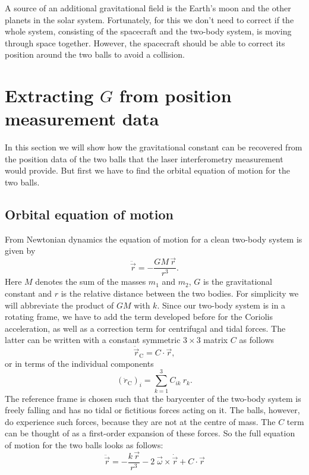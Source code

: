 \documentclass[onecolumn]{aa} %
\begin{document}
A source of an additional gravitational field is the Earth's moon and the other planets in the solar system. Fortunately, for this we don't need to correct if the whole system, consisting of the spacecraft and the two-body system, is moving through space together. However, the spacecraft should be able to correct its position around the two balls to avoid a collision.


\section{Extracting $G$ from position measurement data}

In this section we will show how the gravitational constant can be
recovered from the position data of the two balls that the laser
interferometry measurement would provide.  But first we have to find
the orbital equation of motion for the two balls.

\subsection{Orbital equation of motion}
From Newtonian dynamics the equation of motion for a clean two-body system is given by 
\begin{equation}
\label{eq:eomeasy}
\ddot{\vec{r}} = - \frac{G M\, \vec{r}}{r^3}.
\end{equation}
Here $M$ denotes the sum of the masses $m_1$ and $m_2$, $G$ is the
gravitational constant and $r$ is the relative distance between the
two bodies. For simplicity we will abbreviate the product of $GM$ with
$k$.  Since our two-body system is in a rotating frame, we have to add
the term developed before for the Coriolis acceleration, as well as a
correction term for centrifugal and tidal forces. The latter can be
written with a constant symmetric $3 \times 3$ matrix $C$ as follows
\begin{equation}
\label{eq:tidal}
\ddot{\vec{r}}_{\mathrm{C}} = C \cdot \vec{r},
\end{equation}
or in terms of the individual components 
\begin{equation}
\label{eq:tidacom}
\left(\ddot{r}_\mathrm{C}\right)_i = \sum_{k=1}^{3} C_{ik} \: r_k.
\end{equation}
The reference frame is chosen such that the barycenter of the two-body
system is freely falling and has no tidal or fictitious forces acting
on it.  The balls, however, do experience such forces, because they
are not at the centre of mass.  The $C$ term can be thought of as a
first-order expansion of these forces.  So the full equation of motion
for the two balls looks as follows:
\begin{equation}
\label{eq:eom}
\ddot{\vec{r}} = - \frac{k\,\vec{r}}{r^3} - 2 \; \vec{\omega} \times \dot{\vec{r}} + C \cdot \vec{r}
\end{equation}
\end{document}
